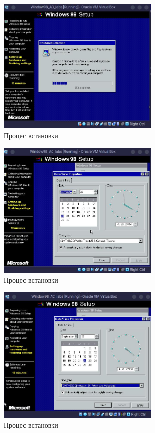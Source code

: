 \begin{figure}[h]
    \centering
    \includegraphics[width=0.7\textwidth]{reports/AC/lab1/assets/19.jpeg}
    \caption{Процес встановки}
\end{figure}

\begin{figure}[h]
    \centering
    \includegraphics[width=0.7\textwidth]{reports/AC/lab1/assets/20.jpeg}
    \caption{Процес встановки}
\end{figure}

\begin{figure}[h]
    \centering
    \includegraphics[width=0.7\textwidth]{reports/AC/lab1/assets/21.jpeg}
    \caption{Процес встановки}
\end{figure}

